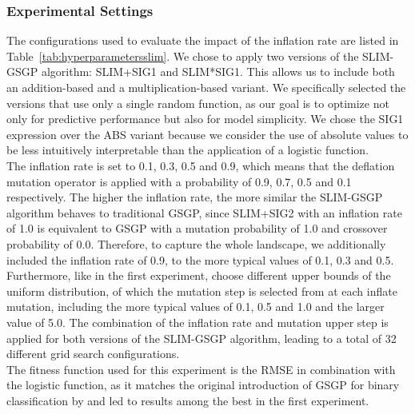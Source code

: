 \documentclass[manuscript, review, anonymous]{acmart} %
\begin{document}
\subsubsection{Experimental Settings}
The configurations used to evaluate the impact of the inflation rate 
are listed in Table~\ref{tab:hyperparametersslim}. 
We chose to apply two versions of the SLIM-GSGP algorithm: SLIM+SIG1 and SLIM*SIG1. 
This allows us to include both an addition-based and a multiplication-based variant. 
We specifically selected the versions that use only a single random function, as 
our goal is to optimize not only for predictive performance but also for model simplicity. 
We chose the SIG1 expression over the ABS variant because we consider the use of
absolute values to be less intuitively interpretable than the application of a logistic function.\\
The inflation rate is set to 0.1, 0.3, 0.5 and
0.9,
which means that the deflation mutation operator is applied with
a probability of 0.9, 0.7, 0.5 and 0.1 respectively. The higher the inflation rate, the 
more similar the SLIM-GSGP algorithm behaves to traditional GSGP, since SLIM+SIG2 with an inflation rate of 1.0
is equivalent to GSGP with a mutation probability of 1.0 and crossover probability of 0.0.
Therefore, to capture the whole landscape, we additionally included the inflation rate of 0.9, 
to the more typical values \cite{Vanneschi2024} of 0.1, 0.3 and 0.5.
Furthermore, like in the first experiment, choose different upper bounds
of the uniform distribution, of which the mutation step is
selected from at each inflate mutation, including the more typical values \cite{Vanneschi2024} of 0.1, 0.5 and 1.0 and the larger value of 5.0.
The combination of the inflation rate and mutation upper step is applied for both versions of the SLIM-GSGP algorithm,
leading
to a total of 32 different grid search configurations.\\
The fitness function used for this experiment is the RMSE
in combination with the logistic function, 
as it matches the original introduction of GSGP for binary classification by \cite{Bakurov2019} 
and led to results among the best in the first experiment.

\end{document}
